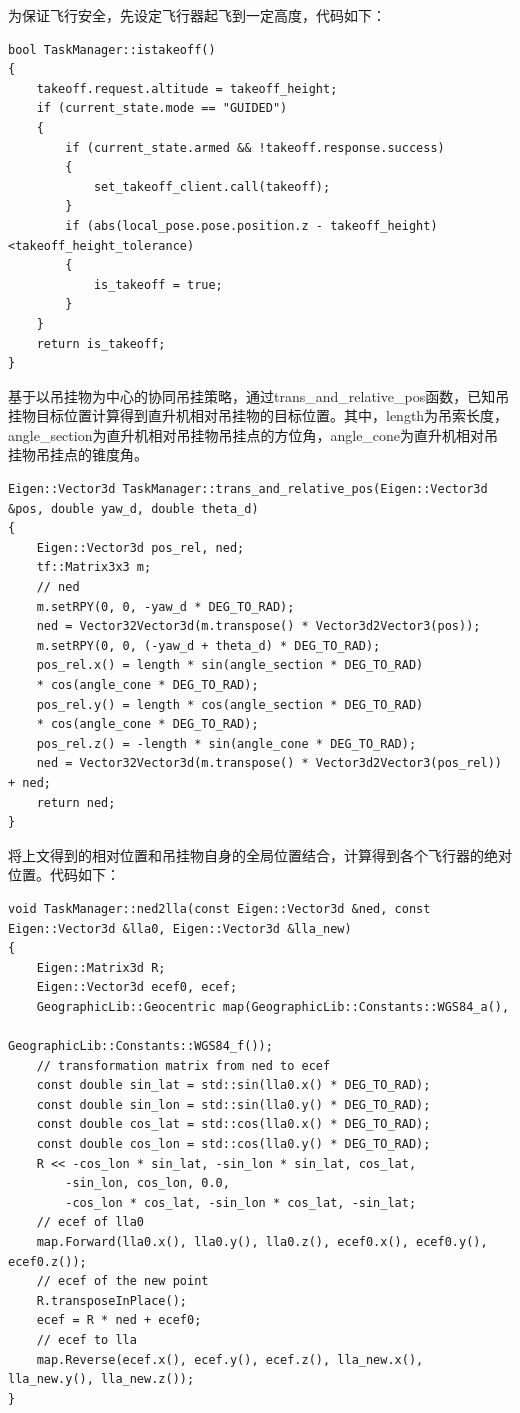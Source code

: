 为保证飞行安全，先设定飞行器起飞到一定高度，代码如下：
\begin{lstlisting}[style = lstStyleBase]
bool TaskManager::istakeoff()
{
    takeoff.request.altitude = takeoff_height;
    if (current_state.mode == "GUIDED")
    {
        if (current_state.armed && !takeoff.response.success)
        {
            set_takeoff_client.call(takeoff);
        }
        if (abs(local_pose.pose.position.z - takeoff_height)<takeoff_height_tolerance)
        {
            is_takeoff = true;
        }
    }
    return is_takeoff;
}
\end{lstlisting}

基于以吊挂物为中心的协同吊挂策略，通过trans\_and\_relative\_pos函数，已知吊挂物目标位置计算得到直升机相对吊挂物的目标位置。其中，length为吊索长度，angle\_section为直升机相对吊挂物吊挂点的方位角，angle\_cone为直升机相对吊挂物吊挂点的锥度角。
\begin{lstlisting}[style = lstStyleBase]
Eigen::Vector3d TaskManager::trans_and_relative_pos(Eigen::Vector3d &pos, double yaw_d, double theta_d)
{
    Eigen::Vector3d pos_rel, ned;
    tf::Matrix3x3 m;
    // ned
    m.setRPY(0, 0, -yaw_d * DEG_TO_RAD);
    ned = Vector32Vector3d(m.transpose() * Vector3d2Vector3(pos));
    m.setRPY(0, 0, (-yaw_d + theta_d) * DEG_TO_RAD);
    pos_rel.x() = length * sin(angle_section * DEG_TO_RAD) 
    * cos(angle_cone * DEG_TO_RAD);
    pos_rel.y() = length * cos(angle_section * DEG_TO_RAD) 
    * cos(angle_cone * DEG_TO_RAD);
    pos_rel.z() = -length * sin(angle_cone * DEG_TO_RAD);
    ned = Vector32Vector3d(m.transpose() * Vector3d2Vector3(pos_rel)) + ned;
    return ned;
}
\end{lstlisting}

将上文得到的相对位置和吊挂物自身的全局位置结合，计算得到各个飞行器的绝对位置。代码如下：
\begin{lstlisting}[style = lstStyleBase]
void TaskManager::ned2lla(const Eigen::Vector3d &ned, const Eigen::Vector3d &lla0, Eigen::Vector3d &lla_new)
{
    Eigen::Matrix3d R;
    Eigen::Vector3d ecef0, ecef;
    GeographicLib::Geocentric map(GeographicLib::Constants::WGS84_a(),
                                  GeographicLib::Constants::WGS84_f());
    // transformation matrix from ned to ecef
    const double sin_lat = std::sin(lla0.x() * DEG_TO_RAD);
    const double sin_lon = std::sin(lla0.y() * DEG_TO_RAD);
    const double cos_lat = std::cos(lla0.x() * DEG_TO_RAD);
    const double cos_lon = std::cos(lla0.y() * DEG_TO_RAD);
    R << -cos_lon * sin_lat, -sin_lon * sin_lat, cos_lat,
        -sin_lon, cos_lon, 0.0,
        -cos_lon * cos_lat, -sin_lon * cos_lat, -sin_lat;
    // ecef of lla0
    map.Forward(lla0.x(), lla0.y(), lla0.z(), ecef0.x(), ecef0.y(), ecef0.z());
    // ecef of the new point
    R.transposeInPlace();
    ecef = R * ned + ecef0;
    // ecef to lla
    map.Reverse(ecef.x(), ecef.y(), ecef.z(), lla_new.x(), lla_new.y(), lla_new.z());
}
\end{lstlisting}

